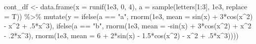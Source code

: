 \documentclass[
  letterpaper,
  DIV=11,
  numbers=noendperiod]{scrreprt}
\newenvironment{Shaded}{\begin{snugshade}}{\end{snugshade}}
\newcommand{\AttributeTok}[1]{\textcolor[rgb]{0.40,0.45,0.13}{#1}}
\newcommand{\DecValTok}[1]{\textcolor[rgb]{0.68,0.00,0.00}{#1}}
\newcommand{\FloatTok}[1]{\textcolor[rgb]{0.68,0.00,0.00}{#1}}
\newcommand{\FunctionTok}[1]{\textcolor[rgb]{0.28,0.35,0.67}{#1}}
\newcommand{\NormalTok}[1]{\textcolor[rgb]{0.00,0.23,0.31}{#1}}
\newcommand{\OtherTok}[1]{\textcolor[rgb]{0.00,0.23,0.31}{#1}}
\newcommand{\SpecialCharTok}[1]{\textcolor[rgb]{0.37,0.37,0.37}{#1}}
\newcommand{\StringTok}[1]{\textcolor[rgb]{0.13,0.47,0.30}{#1}}
\begin{document}
\begin{Shaded}
\begin{Highlighting}[]
\NormalTok{cont\_df }\OtherTok{\textless{}{-}} \FunctionTok{data.frame}\NormalTok{(}\AttributeTok{x =} \FunctionTok{runif}\NormalTok{(}\FloatTok{1e3}\NormalTok{, }\DecValTok{0}\NormalTok{, }\DecValTok{4}\NormalTok{),}
                      \AttributeTok{a =} \FunctionTok{sample}\NormalTok{(letters[}\DecValTok{1}\SpecialCharTok{:}\DecValTok{3}\NormalTok{], }\FloatTok{1e3}\NormalTok{, }\AttributeTok{replace =}\NormalTok{ T)) }\SpecialCharTok{\%\textgreater{}\%}
  \FunctionTok{mutate}\NormalTok{(}\AttributeTok{y =} \FunctionTok{ifelse}\NormalTok{(a }\SpecialCharTok{==} \StringTok{"a"}\NormalTok{,}
                    \FunctionTok{rnorm}\NormalTok{(}\FloatTok{1e3}\NormalTok{, }\AttributeTok{mean =} \FunctionTok{sin}\NormalTok{(x) }\SpecialCharTok{+} \DecValTok{3}\SpecialCharTok{*}\FunctionTok{cos}\NormalTok{(x}\SpecialCharTok{\^{}}\DecValTok{2}\NormalTok{) }\SpecialCharTok{{-}}\NormalTok{ x}\SpecialCharTok{\^{}}\DecValTok{2} \SpecialCharTok{+}\NormalTok{ .}\DecValTok{5}\SpecialCharTok{*}\NormalTok{x}\SpecialCharTok{\^{}}\DecValTok{3}\NormalTok{),}
                    \FunctionTok{ifelse}\NormalTok{(a }\SpecialCharTok{==} \StringTok{"b"}\NormalTok{,}
                           \FunctionTok{rnorm}\NormalTok{(}\FloatTok{1e3}\NormalTok{, }\AttributeTok{mean =} \SpecialCharTok{{-}}\FunctionTok{sin}\NormalTok{(x) }\SpecialCharTok{+} \DecValTok{3}\SpecialCharTok{*}\FunctionTok{cos}\NormalTok{(x}\SpecialCharTok{\^{}}\DecValTok{2}\NormalTok{) }\SpecialCharTok{+}\NormalTok{ x}\SpecialCharTok{\^{}}\DecValTok{2} \SpecialCharTok{{-}}\NormalTok{ .}\DecValTok{2}\SpecialCharTok{*}\NormalTok{x}\SpecialCharTok{\^{}}\DecValTok{3}\NormalTok{),}
                           \FunctionTok{rnorm}\NormalTok{(}\FloatTok{1e3}\NormalTok{, }\AttributeTok{mean =} \DecValTok{6} \SpecialCharTok{+} \DecValTok{2}\SpecialCharTok{*}\FunctionTok{sin}\NormalTok{(x) }\SpecialCharTok{{-}} \FloatTok{1.5}\SpecialCharTok{*}\FunctionTok{cos}\NormalTok{(x}\SpecialCharTok{\^{}}\DecValTok{2}\NormalTok{) }\SpecialCharTok{{-}}\NormalTok{ x}\SpecialCharTok{\^{}}\DecValTok{2} \SpecialCharTok{+}\NormalTok{ .}\DecValTok{5}\SpecialCharTok{*}\NormalTok{x}\SpecialCharTok{\^{}}\DecValTok{3}\NormalTok{))))}
           



\end{Highlighting}
\end{Shaded}
\end{document}
